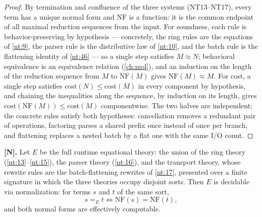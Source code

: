 \begin{proof}
By termination and confluence of the three systems (NT13--NT17), every term
has a unique normal form and $\mathrm{NF}$ is a function: it is the common
endpoint of all maximal reduction sequences from the input. For soundness,
each rule is behavior-preserving by hypothesis --- concretely, the ring
rules are the equations of \autoref{nt:9}, the parser rule is the
distributive law of \autoref{nt:10}, and the batch rule is the flattening
identity of \autoref{nt:46} --- so a single step satisfies $M \approx N$;
behavioral equivalence is an equivalence relation (\autoref{ch:mol}), and an
induction on the length of the reduction sequence from $M$ to
$\mathrm{NF}(M)$ gives $\mathrm{NF}(M) \approx M$. For cost, a single step
satisfies $\mathrm{cost}(N) \leq \mathrm{cost}(M)$ in every component by
hypothesis, and chaining the inequalities along the sequence, by induction
on its length, gives $\mathrm{cost}(\mathrm{NF}(M)) \leq \mathrm{cost}(M)$
componentwise. The two halves are independent; the concrete rules satisfy
both hypotheses: cancellation removes a redundant pair of operations,
factoring parses a shared prefix once instead of once per branch, and
flattening replaces a nested batch by a flat one with the same I/O count.
\end{proof}

\begin{theorem}\label{nt:19}
\textbf{[N].} Let $E$ be the full runtime equational theory: the union of
the ring theory (\autoref{nt:13}--\autoref{nt:15}), the parser theory
(\autoref{nt:16}), and the transport theory, whose rewrite rules are the
batch-flattening rewrites of \autoref{nt:17}, presented over a finite
signature in which the three theories occupy disjoint sorts. Then $E$ is
decidable via normalization: for terms $s$ and $t$ of the same sort,
\[
s =_E t \iff \mathrm{NF}(s) = \mathrm{NF}(t),
\]
and both normal forms are effectively computable.
\end{theorem}


